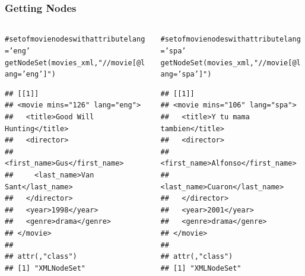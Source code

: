 \documentclass{beamer}\usepackage[]{graphicx}\usepackage[]{color}
\makeatletter
\newcommand{\hlstr}[1]{\textcolor[rgb]{0.063,0.58,0.627}{#1}}%
\newcommand{\hlcom}[1]{\textcolor[rgb]{0.588,0.588,0.588}{#1}}%
\newcommand{\hlstd}[1]{\textcolor[rgb]{0.196,0.196,0.196}{#1}}%
\newcommand{\hlkwd}[1]{\textcolor[rgb]{0.78,0.227,0.412}{#1}}%
\newenvironment{kframe}{%
 \def\at@end@of@kframe{}%
 \ifinner\ifhmode%
  \def\at@end@of@kframe{\end{minipage}}%
  \begin{minipage}{\columnwidth}%
 \fi\fi%
 \def\FrameCommand##1{\hskip\@totalleftmargin \hskip-\fboxsep
 \colorbox{shadecolor}{##1}\hskip-\fboxsep
     \hskip-\linewidth \hskip-\@totalleftmargin \hskip\columnwidth}%
 \MakeFramed {\advance\hsize-\width
   \@totalleftmargin\z@ \linewidth\hsize
   \@setminipage}}%
 {\par\unskip\endMakeFramed%
 \at@end@of@kframe}
\newenvironment{knitrout}{}{} %
\makeatother
\begin{document}

\begin{frame}[fragile]
\frametitle{Getting Nodes}

\begin{columns}[t]
\begin{column}{0.5\textwidth}
\begin{knitrout}\tiny
{}\color{fgcolor}\begin{kframe}
\begin{alltt}
\hlcom{# set of movie nodes with attribute lang = 'eng'}
\hlkwd{getNodeSet}\hlstd{(movies_xml,} \hlstr{"//movie[@lang='eng']"}\hlstd{)}
\end{alltt}
\begin{verbatim}
## [[1]]
## <movie mins="126" lang="eng">
##   <title>Good Will Hunting</title>
##   <director>
##     <first_name>Gus</first_name>
##     <last_name>Van Sant</last_name>
##   </director>
##   <year>1998</year>
##   <genre>drama</genre>
## </movie> 
## 
## attr(,"class")
## [1] "XMLNodeSet"
\end{verbatim}
\end{kframe}
\end{knitrout}
\end{column}

\begin{column}{0.5\textwidth}
\begin{knitrout}\tiny
{}\color{fgcolor}\begin{kframe}
\begin{alltt}
\hlcom{# set of movie nodes with attribute lang = 'spa'}
\hlkwd{getNodeSet}\hlstd{(movies_xml,} \hlstr{"//movie[@lang='spa']"}\hlstd{)}
\end{alltt}
\begin{verbatim}
## [[1]]
## <movie mins="106" lang="spa">
##   <title>Y tu mama tambien</title>
##   <director>
##     <first_name>Alfonso</first_name>
##     <last_name>Cuaron</last_name>
##   </director>
##   <year>2001</year>
##   <genre>drama</genre>
## </movie> 
## 
## attr(,"class")
## [1] "XMLNodeSet"
\end{verbatim}
\end{kframe}
\end{knitrout}
\end{column}
\end{columns}

\end{frame}
\end{document}
